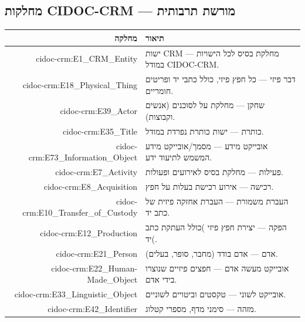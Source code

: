 \subsection{מחלקות CIDOC-CRM — מורשת תרבותית}

\begin{longtable}{|r|p{10cm}|}
\hline
\textbf{מחלקה} & \textbf{תיאור} \\
\hline
\endhead

cidoc-crm:E1\_CRM\_Entity & 
ישות CRM — מחלקת בסיס לכל הישויות במודל CIDOC-CRM.\\
\hline

cidoc-crm:E18\_Physical\_Thing & 
דבר פיזי — כל חפץ פיזי, כולל כתבי יד ופריטים חומריים.\\
\hline

cidoc-crm:E39\_Actor & 
שחקן — מחלקת על לסוכנים (אנשים וקבוצות).\\
\hline

cidoc-crm:E35\_Title & 
כותרת — ישות כותרת נפרדת במודל.\\
\hline

cidoc-crm:E73\_Information\_Object & 
אובייקט מידע — מסמך/אובייקט מידע המשמש לתיעוד ידע.\\
\hline

cidoc-crm:E7\_Activity & 
פעילות — מחלקת בסיס לאירועים ופעולות.\\
\hline

cidoc-crm:E8\_Acquisition & 
רכישה — אירוע רכישת בעלות על חפץ.\\
\hline

cidoc-crm:E10\_Transfer\_of\_Custody & 
העברת משמורת — העברת אחזקה פיזית של כתב יד.\\
\hline

cidoc-crm:E12\_Production & 
הפקה — יצירת חפץ פיזי )כולל העתקת כתב יד(.\\
\hline

cidoc-crm:E21\_Person & 
אדם — אדם בודד (מחבר, סופר, בעלים).\\
\hline

cidoc-crm:E22\_Human-Made\_Object & 
אובייקט מעשה אדם — חפצים פיזיים שנוצרו בידי אדם.\\
\hline

cidoc-crm:E33\_Linguistic\_Object & 
אובייקט לשוני — טקסטים וביטויים לשוניים.\\
\hline

cidoc-crm:E42\_Identifier & 
מזהה — סימני מדף, מספרי קטלוג.\\
\hline


\end{longtable}
